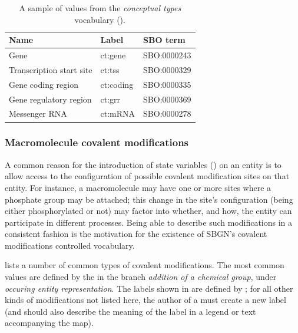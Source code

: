 \begin{table}[h]
  \centering
  \begin{tabular}{l>{\ttfamily}l>{\ttfamily}l}
    \toprule
    \textbf{Name}              & \textbf{\rmfamily Label} & \textbf{\rmfamily SBO term} \\
    \midrule
    Gene                      & ct:gene   & SBO:0000243\\
    Transcription start site  & ct:tss    & SBO:0000329\\
    Gene coding region        & ct:coding & SBO:0000335\\
    Gene regulatory region    & ct:grr    & SBO:0000369\\
    Messenger RNA             & ct:mRNA   & SBO:0000278\\
    \bottomrule
  \end{tabular}
  \caption{A sample of values from the \emph{conceptual types} vocabulary
    ().}
  \label{tab:conceptual-types-cv}
\end{table}


\subsubsection{Macromolecule covalent modifications}
\label{sec:covalent-mod-cv}

A common reason for the introduction of state variables () on an entity is to allow access to the configuration of possible covalent modification sites on that entity.  For instance, a macromolecule may have one or more sites where a phosphate group may be attached; this change in the site's configuration (\ie being either phosphorylated or not) may factor into whether, and how, the entity can participate in different processes.  Being able to describe such modifications in a consistent fashion is the motivation for the existence of SBGN's covalent modifications controlled vocabulary.  

 lists a number of common types of covalent modifications.  The most common values are defined by the \sbo in the branch \emph{addition of a chemical group}, under \emph{occuring entity representation}. The labels shown in  are defined by \SBGNPDLone; for all other kinds of modifications not listed here, the author of a \PD must create a new label (and should also describe the meaning of the label in a legend or text accompanying the map).

